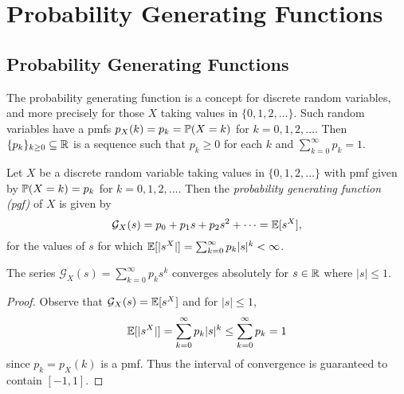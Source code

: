 \chapter{Probability Generating Functions}

\section{Probability Generating Functions}

The probability generating function is a concept
for discrete random variables, and more precisely
for those $X$ taking values in
$\{0, 1, 2, \dots\}$. Such
random variables have a pmfs $p_X(k) = p_k = \mathbb{P}(X = k)$
for $k = 0, 1, 2, \dots$. Then
$\{p_k\}_{k \ge 0} \subseteq \mathbb{R}$ is a sequence
such that $p_k \ge 0$ for
each $k$ and $\sum_{k = 0}^\infty p_k = 1$.

\begin{definition}
  Let $X$ be a discrete random variable taking
  values in $\{0, 1, 2, \dots\}$ with pmf given
  by $\mathbb{P}(X = k) = p_k$ for $k = 0, 1, 2, \dots$.
  Then the \emph{probability generating function (pgf)}
  of $X$ is given by
  \[
    \mathcal{G}_X(s) = p_0 + p_1s + p_2s^2 + \dots
    = \mathbb{E}[s^X],
  \]
  for the values of $s$ for which
  $\mathbb{E}[|s^X|] = \sum_{k = 0}^\infty p_k |s|^k < \infty$.
\end{definition}

\begin{prop}
  The series $\mathcal{G}_X(s) = \sum_{k = 0}^\infty p_k s^k$ converges
  absolutely for $s \in \mathbb{R}$ where $|s| \le 1$.
\end{prop}

\begin{proof}
  Observe that $\mathcal{G}_X(s) = \mathbb{E}[s^X]$
  and for $|s| \le 1$,
  \[
    \mathbb{E}[|s^X|]
    = \sum_{k = 0}^\infty p_k |s|^k
    \le \sum_{k = 0}^\infty p_k
    = 1
  \]
  since $p_k = p_X(k)$ is a pmf. Thus the
  interval of convergence is guaranteed to contain
  $[-1, 1]$.
\end{proof}


